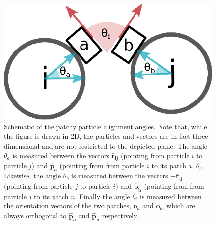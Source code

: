 \begin{figure}[h]
\centering
\includegraphics[width=0.8\linewidth]{figures/pp.eps}
\caption{Schematic of the patchy particle alignment angles. Note that, while the figure is drawn in 2D, the particles and vectors are in fact three--dimensional and are not restricted to the depicted plane. The angle \(\theta_a\) is measured between the vectors \(\mathbf{\hat{r}_{ij}}\) (pointing from particle \(i\) to particle \(j\)) and \(\mathbf{\hat{p}_a}\) (pointing from from particle \(i\) to its patch \(a\).  \(\theta_b\). Likewise, the angle \(\theta_b\) is measured between the vectors \(-\mathbf{\hat{r}_{ij}}\) (pointing from particle \(j\) to particle \(i\)) and \(\mathbf{\hat{p}_b}\) (pointing from from particle \(j\) to its patch \(n\). Finally the angle \(\theta_t\) is measured between the orientation vectors of the two patches, \(\mathbf{o}_{a}\) and \(\mathbf{o}_{b}\), which are always orthogonal to \(\mathbf{\hat{p}_a}\) and \(\mathbf{\hat{p}_b}\) respectively.
}
\label{fig:pp}
\end{figure}

